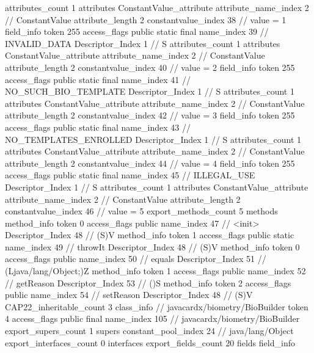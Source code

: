 {{{{{				attributes_count	1
				attributes {
				ConstantValue_attribute {
					attribute_name_index	2		// ConstantValue
					attribute_length	2
					constantvalue_index	38		// value = 1
				}
				}
			}
			field_info {
				token	255
				access_flags	public static final
				name_index	39		// INVALID_DATA
				Descriptor_Index	1		// S
				attributes_count	1
				attributes {
				ConstantValue_attribute {
					attribute_name_index	2		// ConstantValue
					attribute_length	2
					constantvalue_index	40		// value = 2
				}
				}
			}
			field_info {
				token	255
				access_flags	public static final
				name_index	41		// NO_SUCH_BIO_TEMPLATE
				Descriptor_Index	1		// S
				attributes_count	1
				attributes {
				ConstantValue_attribute {
					attribute_name_index	2		// ConstantValue
					attribute_length	2
					constantvalue_index	42		// value = 3
				}
				}
			}
			field_info {
				token	255
				access_flags	public static final
				name_index	43		// NO_TEMPLATES_ENROLLED
				Descriptor_Index	1		// S
				attributes_count	1
				attributes {
				ConstantValue_attribute {
					attribute_name_index	2		// ConstantValue
					attribute_length	2
					constantvalue_index	44		// value = 4
				}
				}
			}
			field_info {
				token	255
				access_flags	public static final
				name_index	45		// ILLEGAL_USE
				Descriptor_Index	1		// S
				attributes_count	1
				attributes {
				ConstantValue_attribute {
					attribute_name_index	2		// ConstantValue
					attribute_length	2
					constantvalue_index	46		// value = 5
				}
				}
			}
			}
			export_methods_count	5
			methods {
				method_info {
					token	0
					access_flags	public
					name_index	47		// <init>
					Descriptor_Index	48		// (S)V
				}
				method_info {
					token	1
					access_flags	public static
					name_index	49		// throwIt
					Descriptor_Index	48		// (S)V
				}
				method_info {
					token	0
					access_flags	public
					name_index	50		// equals
					Descriptor_Index	51		// (Ljava/lang/Object;)Z
				}
				method_info {
					token	1
					access_flags	public
					name_index	52		// getReason
					Descriptor_Index	53		// ()S
				}
				method_info {
					token	2
					access_flags	public
					name_index	54		// setReason
					Descriptor_Index	48		// (S)V
				}
			}
			CAP22_inheritable_count	3
		}
		class_info {		// javacardx/biometry/BioBuilder
			token	4
			access_flags	public final
			name_index	105		// javacardx/biometry/BioBuilder
			export_supers_count	1
			supers {
				constant_pool_index	24		// java/lang/Object
			}
			export_interfaces_count	0
			interfaces {
			}
			export_fields_count	20
			fields {
			field_info {
}}}}}
